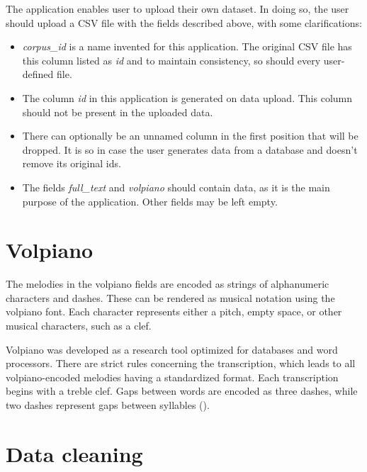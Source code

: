 The application enables user to upload their own dataset. In doing so, the user should upload a CSV file with the fields described above, with
some clarifications:

\begin{itemize}
    \item \emph{corpus\_id} is a name invented for this application. The original CSV file has this column listed as \emph{id} and
        to maintain consistency, so should every user-defined file.
    \item The column \emph{id} in this application is generated on data upload. This column should not be present in the uploaded
        data.
    \item There can optionally be an unnamed column in the first position that will be dropped. It is so in case the user generates
        data from a database and doesn't remove its original ids.
    \item The fields \emph{full\_text} and \emph{volpiano} should contain data, as it is the main purpose of the application. Other
        fields may be left empty.
\end{itemize}

\section{Volpiano}

The melodies in the volpiano fields are encoded as strings of alphanumeric characters and dashes. These can be rendered as musical notation using
the volpiano font. Each character represents either a pitch, empty space, or other musical characters, such as a clef.

Volpiano was developed as a research tool optimized for databases and word processors. There are strict rules concerning the transcription, which leads
to all volpiano-encoded melodies having a standardized format. Each transcription begins with a treble clef. Gaps between words are encoded as three
dashes, while two dashes represent gaps between syllables (\cite{volpiano}).

\section{Data cleaning}

